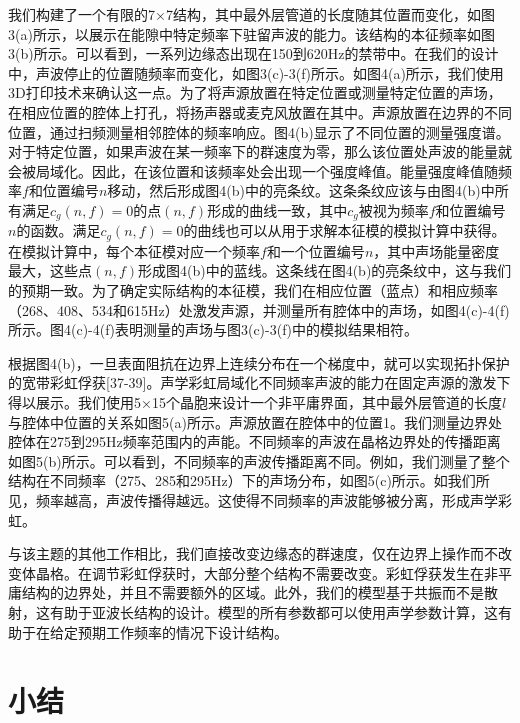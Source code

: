 我们构建了一个有限的7×7结构，其中最外层管道的长度随其位置而变化，如图3(a)所示，以展示在能隙中特定频率下驻留声波的能力。该结构的本征频率如图3(b)所示。可以看到，一系列边缘态出现在150到620Hz的禁带中。在我们的设计中，声波停止的位置随频率而变化，如图3(c)-3(f)所示。如图4(a)所示，我们使用3D打印技术来确认这一点。为了将声源放置在特定位置或测量特定位置的声场，在相应位置的腔体上打孔，将扬声器或麦克风放置在其中。声源放置在边界的不同位置，通过扫频测量相邻腔体的频率响应。图4(b)显示了不同位置的测量强度谱。对于特定位置，如果声波在某一频率下的群速度为零，那么该位置处声波的能量就会被局域化。因此，在该位置和该频率处会出现一个强度峰值。能量强度峰值随频率$f$和位置编号$n$移动，然后形成图4(b)中的亮条纹。这条条纹应该与由图4(b)中所有满足$c_g(n,f)=0$的点$(n,f)$形成的曲线一致，其中$c_g$被视为频率$f$和位置编号$n$的函数。满足$c_g(n,f)=0$的曲线也可以从用于求解本征模的模拟计算中获得。在模拟计算中，每个本征模对应一个频率$f$和一个位置编号$n$，其中声场能量密度最大，这些点$(n,f)$形成图4(b)中的蓝线。这条线在图4(b)的亮条纹中，这与我们的预期一致。为了确定实际结构的本征模，我们在相应位置（蓝点）和相应频率（268、408、534和615Hz）处激发声源，并测量所有腔体中的声场，如图4(c)-4(f)所示。图4(c)-4(f)表明测量的声场与图3(c)-3(f)中的模拟结果相符。

根据图4(b)，一旦表面阻抗在边界上连续分布在一个梯度中，就可以实现拓扑保护的宽带彩虹俘获[37-39]。声学彩虹局域化不同频率声波的能力在固定声源的激发下得以展示。我们使用5×15个晶胞来设计一个非平庸界面，其中最外层管道的长度$l$与腔体中位置的关系如图5(a)所示。声源放置在腔体中的位置1。我们测量边界处腔体在275到295Hz频率范围内的声能。不同频率的声波在晶格边界处的传播距离如图5(b)所示。可以看到，不同频率的声波传播距离不同。例如，我们测量了整个结构在不同频率（275、285和295Hz）下的声场分布，如图5(c)所示。如我们所见，频率越高，声波传播得越远。这使得不同频率的声波能够被分离，形成声学彩虹。

与该主题的其他工作相比，我们直接改变边缘态的群速度，仅在边界上操作而不改变体晶格。在调节彩虹俘获时，大部分整个结构不需要改变。彩虹俘获发生在非平庸结构的边界处，并且不需要额外的区域。此外，我们的模型基于共振而不是散射，这有助于亚波长结构的设计。模型的所有参数都可以使用声学参数计算，这有助于在给定预期工作频率的情况下设计结构。

\section{小结}